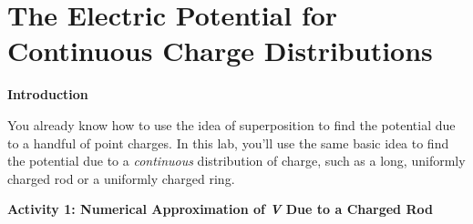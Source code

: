 \section{The Electric Potential for Continuous Charge Distributions}
\label{potential_charge_distributions}


\makelabheader %

\bigskip

\textbf{Introduction} 

You already know how to use the idea of superposition to find the potential due to a handful of point charges.  In this lab, you'll use the same basic idea to find the potential due to a \textit{continuous} distribution of charge, such as a long, uniformly charged rod or a uniformly charged ring.

\bigskip

\textbf{Activity 1: Numerical Approximation of \textit{V} Due to a Charged Rod}

